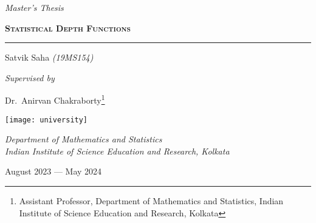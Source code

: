 \begin{titlepage}
    \vspace*{2cm}

    {\noindent\huge\itshape\color{black!70!white}
        Master's Thesis
    }
    \vspace{0.8cm}

    {\noindent\Huge\scshape\bfseries%
        Statistical Depth Functions
    }

    \vspace{0.8cm}
    \hrule
    \vspace{0.4cm}

    {\noindent\Large Satvik Saha \textcolor{black!70!white}{\textit{(19MS154)}}}
    \vspace{0.6cm}

    {\noindent\Large\itshape Supervised by}
    \vspace{0.1cm}

    \renewcommand*{\thefootnote}{\fnsymbol{footnote}}
    {\noindent\Large Dr.~Anirvan Chakraborty\footnote{Assistant Professor, Department of Mathematics and Statistics, Indian Institute of Science Education and Research, Kolkata}}
    \renewcommand*{\thefootnote}{\arabic{footnote}}
    \setcounter{footnote}{0}

    \vfill

    \noindent\texttt{[image: university]}

    \vspace{0.2cm}

    {\noindent\large\itshape
        Department of Mathematics and Statistics \vspace{0.2em}\\
        Indian Institute of Science Education and Research, Kolkata \\
    }
    \vspace{0.8cm}

    {\noindent\large August 2023 \;---\; May 2024}

    \vspace*{2cm}
\end{titlepage}
